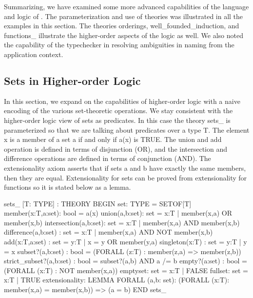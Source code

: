 Summarizing, we have examined some more advanced capabilities of the
language and logic of \pvs\@.  The parameterization and use of
theories was illustrated in all the examples in this section.  The
theories {\stt orderings}, {\stt well\_founded\_induction}, and {\stt
functions\_} illustrate the higher-order aspects of the logic as well.
We also noted the capability of the typechecker in resolving
ambiguities in naming from the application context.

\subsection{Sets in Higher-order Logic}
\label{sets-in-hol}

In this section, we expand on the capabilities of higher-order logic
with a naive encoding of the various set-theoretic operations.  We
stay consistent with the higher-order logic view of sets as predicates.
In this case the theory {\stt sets\_} is parameterized so that we are
talking about predicates over a type {\stt T}.  The element {\stt x} is a
member of a set {\stt a} if and only if {\stt a(x)} is {\stt TRUE}.  The
{\stt union} and {\stt add} operation is defined in terms of disjunction
({\stt OR}), and the intersection and difference operations are defined
in terms of conjunction ({\stt AND}).  The extensionality axiom asserts
that if sets {\stt a} and {\stt b} have exactly the same members, then
they are equal.  Extensionality for sets can be proved from
extensionality for functions so it is stated below as a lemma.
\begin{pvsexample}
  sets_ [T: TYPE] : THEORY
   BEGIN
    set: TYPE = SETOF[T]
    member(x:T,a:set): bool = a(x)
    union(a,b:set): set = {x:T | member(x,a) OR member(x,b)}
    intersection(a,b:set): set = {x:T | member(x,a) AND member(x,b)}
    difference(a,b:set) : set = {x:T | member(x,a) AND NOT member(x,b)}
    add(x:T,a:set) : set = {y:T | x = y OR member(y,a)}
    singleton(x:T) : set = {y:T | y = x}
    subset?(a,b:set) : bool = (FORALL (z:T) : member(z,a) => member(z,b))
    strict_subset?(a,b:set) : bool = subset?(a,b) AND a /= b
    empty?(a:set) : bool = (FORALL (x:T) : NOT member(x,a))
    emptyset: set = {x:T | FALSE}
    fullset: set = {x:T | TRUE}
    extensionality: LEMMA
      FORALL (a,b: set):
        (FORALL (x:T): member(x,a) = member(x,b)) => (a = b)
   END sets_
\end{pvsexample}

